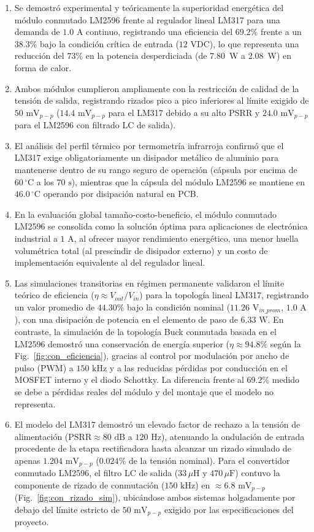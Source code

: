 \documentclass[conference]{IEEEtran}
\begin{document}
\begin{enumerate}
    \item Se demostró experimental y teóricamente la superioridad energética del módulo conmutado LM2596 frente al regulador lineal LM317 para una demanda de $1.0\text{ A}$ continuo, registrando una eficiencia del $69.2\%$ frente a un $38.3\%$ bajo la condición crítica de entrada ($12\text{ VDC}$), lo que representa una reducción del $73\%$ en la potencia desperdiciada (de 7.80~W a 2.08~W) en forma de calor.
    \item Ambos módulos cumplieron ampliamente con la restricción de calidad de la tensión de salida, registrando rizados pico a pico inferiores al límite exigido de $50\text{ mV}_{p-p}$ ($14.4\text{ mV}_{p-p}$ para el LM317 debido a su alto PSRR y $24.0\text{ mV}_{p-p}$ para el LM2596 con filtrado LC de salida).
    \item El análisis del perfil térmico por termometría infrarroja confirmó que el LM317 exige obligatoriamente un disipador metálico de aluminio para mantenerse dentro de su rango seguro de operación (cápsula por encima de $60\,^{\circ}\text{C}$ a los $70\text{ s}$), mientras que la cápsula del módulo LM2596 se mantiene en $46.0\,^{\circ}\text{C}$ operando por disipación natural en PCB.
    \item En la evaluación global tamaño-costo-beneficio, el módulo conmutado LM2596 se consolida como la solución óptima para aplicaciones de electrónica industrial a $1\text{ A}$, al ofrecer mayor rendimiento energético, una menor huella volumétrica total (al prescindir de disipador externo) y un costo de implementación equivalente al del regulador lineal.
    \item Las simulaciones transitorias en régimen permanente validaron el límite teórico de eficiencia ($\eta \approx V_{out}/V_{in}$) para la topología lineal LM317, registrando un valor promedio de $44.30\%$ bajo la condición nominal ($11.26\text{ V}_{in\_prom}$, $1.0\text{ A}$), con una disipación de potencia en el elemento de paso de $6.33\text{ W}$. En contraste, la simulación de la topología Buck conmutada basada en el LM2596 demostró una conservación de energía superior ($\eta \approx 94.8\%$ según la Fig.~\ref{fig:con_eficiencia}), gracias al control por modulación por ancho de pulso (PWM) a $150\text{ kHz}$ y a las reducidas pérdidas por conducción en el MOSFET interno y el diodo Schottky. La diferencia frente al 69.2\% medido se debe a pérdidas reales del módulo y del montaje que el modelo no representa.
    \item El modelo del LM317 demostró un elevado factor de rechazo a la tensión de alimentación ($\text{PSRR} \approx 80\text{ dB}$ a $120\text{ Hz}$), atenuando la ondulación de entrada procedente de la etapa rectificadora hasta alcanzar un rizado simulado de apenas $1.204\text{ mV}_{p-p}$ ($0.024\%$ de la tensión nominal). Para el convertidor conmutado LM2596, el filtro LC de salida ($33\,\mu\text{H}$ y $470\,\mu\text{F}$) contuvo la componente de rizado de conmutación ($150\text{ kHz}$) en $\approx 6.8\text{ mV}_{p-p}$ (Fig.~\ref{fig:con_rizado_sim}), ubicándose ambos sistemas holgadamente por debajo del límite estricto de $50\text{ mV}_{p-p}$ exigido por las especificaciones del proyecto.

\end{enumerate}
\end{document}
